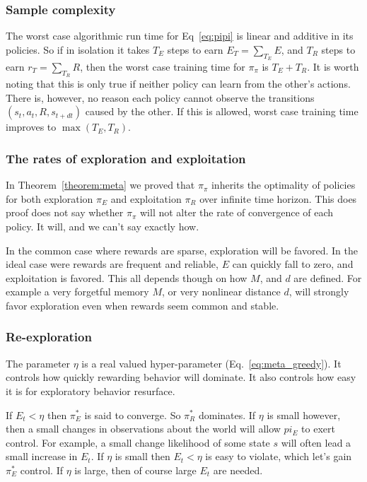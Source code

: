 \documentclass[9pt,lineno]{elife}
\begin{document}
\subsubsection*{Sample complexity}
The worst case algorithmic run time for Eq~\ref{eq:pipi} is linear and additive in its policies. So if in isolation it takes $T_E$ steps to earn $E_{T} = \sum_{T_E} E$, and $T_R$ steps to earn $r_{T} = \sum_{T_R} R$, then the worst case training time for $\pi_{\pi}$ is $T_E + T_R$. It is worth noting that this is only true if neither policy can learn from the other's actions. There is, however, no reason each policy cannot observe the transitions $(s_t, a_t, R, s_{t+dt})$ caused by the other. If this is allowed, worst case training time improves to $\max(T_E, T_R)$.

\subsubsection*{The rates of exploration and exploitation}
In Theorem~\ref{theorem:meta} we proved that $\pi_{\pi}$ inherits the optimality of policies for both exploration $\pi_E$ and exploitation $\pi_R$ over infinite time horizon. This does proof does not say whether $\pi_{\pi}$ will not alter the rate of convergence of each policy. It will, and we can't say exactly how. 

In the common case where rewards are sparse, exploration will be favored. In the ideal case were rewards are frequent and reliable, $E$ can quickly fall to zero, and exploitation is favored. This all depends though on how $M$, and $d$ are defined. For example a very forgetful memory $M$, or very nonlinear distance $d$, will strongly favor exploration even when rewards seem common and stable.

\subsubsection*{Re-exploration}
The parameter $\eta$ is a real valued hyper-parameter (Eq.~\ref{eq:meta_greedy}). It controls how quickly rewarding behavior will dominate. It also controls how easy it is for exploratory behavior resurface. 

If $E_t < \eta$ then $\pi^*_E$ is said to converge. So $\pi^*_R$ dominates. If $\eta$ is small however, then a small changes in observations about the world will allow $pi_E$ to exert control. For example, a small change likelihood of some state $s$ will often lead a small increase in $E_t$. If $\eta$ is small then $E_t < \eta$ is easy to violate, which let's gain $\pi^*_E$ control. If $\eta$ is large, then of course large $E_t$ are needed. 
\end{document}
